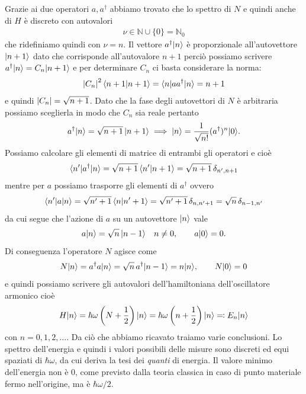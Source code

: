 Grazie ai due operatori $ a, a^\dag $ abbiamo trovato che lo spettro di $ N $ e quindi anche di $ H $ è discreto con autovalori 
\begin{align*}
  \nu \in \mathbb{N} \cup \{0\} = \mathbb{N}_0
\end{align*}
che ridefiniamo quindi con $ \nu = n $. Il vettore $ a^\dag \vert n \rangle $ è proporzionale all'autovettore $ \vert n + 1 \rangle $ dato che corrisponde all'autovalore 
$ n+1 $ perciò possiamo scrivere $ a^\dag \vert n \rangle = C_n \vert n+1 \rangle $ e per determinare $ C_n $ ci basta considerare la norma:
\begin{align*}
  \left|{C_n}\right|^2 \langle n+1|n+1 \rangle = \langle n | a a^\dag | n  \rangle = n+1
\end{align*}
e quindi $ \left|{C_n}\right| = \sqrt{n+1} $. Dato che la fase degli autovettori di $ N $ è arbitraria possiamo sceglierla in modo che $ C_n $ sia reale pertanto 
\begin{align*}
  a^\dag \vert n \rangle = \sqrt{n+1}\, \vert n+1 \rangle \implies \vert n \rangle = \frac1{\sqrt{n!}} (a^\dag)^n \vert 0 \rangle.
\end{align*}
Possiamo calcolare gli elementi di matrice di entrambi gli operatori e cioè 
\begin{align*}
  \langle n' | a^\dag | n \rangle = \sqrt{n+1}\, \langle n' | n+1 \rangle = \sqrt{n+1} \,\delta_{n', n+1}
\end{align*}
mentre per $ a $ possiamo trasporre gli elementi di $ a^\dag $ ovvero 
\begin{align*}
  \langle n' | a | n \rangle = \sqrt{n' + 1} \, \langle n | n' + 1 \rangle = \sqrt{n' + 1} \, \delta_{n, n'+1} = \sqrt{n} \, \delta_{n - 1, n'}
\end{align*}
da cui segue che l'azione di $ a $ su un autovettore $ \vert n \rangle $ vale 
\begin{align*}
  a \vert n \rangle = \sqrt{n} \, \vert n - 1 \rangle \quad n \neq 0, \qquad a\vert 0 \rangle = 0.
\end{align*}
Di conseguenza l'operatore $ N $ agisce come 
\begin{align*}
  N \vert n \rangle = a^\dag a\vert n \rangle =  \sqrt{n} \, a^\dag\vert n - 1 \rangle = n \vert n \rangle, \qquad N \vert 0 \rangle = 0
\end{align*}
e quindi possiamo scrivere gli autovalori dell'hamiltoniana dell'oscillatore armonico cioè
\begin{align*}
  H \vert n \rangle = {\hbar \omega} \left( N + \frac12 \right)\vert n \rangle = {\hbar \omega} \left( n + \frac12 \right) \vert n \rangle \eqcolon E_n \vert n \rangle
\end{align*}
con $ n = 0, 1, 2, \dots $. Da ciò che abbiamo ricavato traiamo varie conclusioni. Lo spettro dell'energia e quindi i valori 
possibili delle misure sono discreti ed equi spaziati di $ \hbar \omega $, da cui deriva la tesi dei \textit{quanti} di energia. 
Il valore minimo dell'energia non è $ 0 $, come previsto dalla teoria classica in caso di punto materiale fermo nell'origine, ma è $ {\hbar \omega}/2 $.


